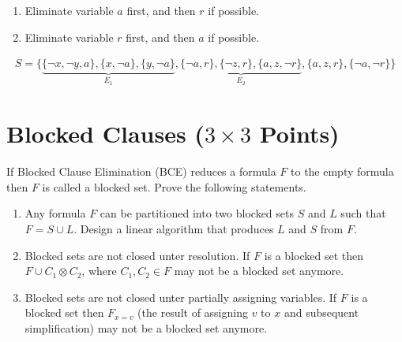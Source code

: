 \documentclass[a4paper]{article}
\begin{document}
\begin{enumerate}\setlength{\itemsep}{0pt}
\item Eliminate variable $a$ first, and then $r$ if possible.
\item Eliminate variable $r$ first, and then $a$ if possible.
\end{enumerate}
\vspace*{-1ex}
\begin{align*}
S = \bigl\{ \underbrace{\{ \lnot x, \lnot y, a \}, \{ x, \lnot a \}, \{ y, \lnot a \}}_{E_1},
\underbrace{\{ \lnot a, r \}, \{ \lnot z, r \}, \{ a, z, \lnot r \}}_{E_2}, \{ a, z, r \},
\{ \lnot a, \lnot r \} \bigr\}
\end{align*}


\section{Blocked Clauses ($3\times 3$ Points)}
If Blocked Clause Elimination (BCE) reduces a formula $F$ to the empty formula then $F$ is called a blocked set.
Prove the following statements.

\begin{enumerate}\setlength{\itemsep}{0pt}
	\item Any formula $F$ can be partitioned into two blocked sets $S$ and $L$ such that $F = S\cup L$.
    Design a linear algorithm that produces $L$ and $S$ from $F$.
	\item Blocked sets are not closed unter resolution. 
    If $F$ is a blocked set then $F \cup C_1 \otimes C_2$, where $C_1,C_2 \in F$ may not be a blocked set anymore.
	\item Blocked sets are not closed unter partially assigning variables.
    If $F$ is a blocked set then $F_{x=v}$ (the result of assigning $v$ to $x$ and subsequent simplification) may not be a blocked set anymore.
\end{enumerate}
\end{document}
